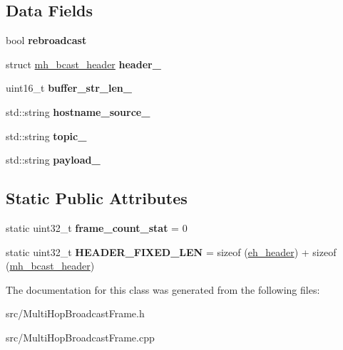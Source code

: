 \subsection*{Data Fields}
\begin{DoxyCompactItemize}
\item 
\hypertarget{classMultiHopBroadcastFrame_af3386512fd14333945a2880d56a49050}{bool {\bfseries rebroadcast}}\label{classMultiHopBroadcastFrame_af3386512fd14333945a2880d56a49050}

\item 
\hypertarget{classMultiHopBroadcastFrame_aa0908ec720cf4b166d8241bbeda3ef72}{struct \hyperlink{structmh__bcast__header}{mh\-\_\-bcast\-\_\-header} {\bfseries header\-\_\-}}\label{classMultiHopBroadcastFrame_aa0908ec720cf4b166d8241bbeda3ef72}

\item 
\hypertarget{classMultiHopBroadcastFrame_a74ca707efb4010d99e5fedc2c0139b7e}{uint16\-\_\-t {\bfseries buffer\-\_\-str\-\_\-len\-\_\-}}\label{classMultiHopBroadcastFrame_a74ca707efb4010d99e5fedc2c0139b7e}

\item 
\hypertarget{classMultiHopBroadcastFrame_ac02d0f6c484c46b61306308a37a24ea2}{std\-::string {\bfseries hostname\-\_\-source\-\_\-}}\label{classMultiHopBroadcastFrame_ac02d0f6c484c46b61306308a37a24ea2}

\item 
\hypertarget{classMultiHopBroadcastFrame_aab544fda0811d4003524c23299390ecf}{std\-::string {\bfseries topic\-\_\-}}\label{classMultiHopBroadcastFrame_aab544fda0811d4003524c23299390ecf}

\item 
\hypertarget{classMultiHopBroadcastFrame_a52f9b2799c52d49cf8ee0cea737de234}{std\-::string {\bfseries payload\-\_\-}}\label{classMultiHopBroadcastFrame_a52f9b2799c52d49cf8ee0cea737de234}

\end{DoxyCompactItemize}
\subsection*{Static Public Attributes}
\begin{DoxyCompactItemize}
\item 
\hypertarget{classMultiHopBroadcastFrame_a4db937c772e736c50aca80727128310a}{static uint32\-\_\-t {\bfseries frame\-\_\-count\-\_\-stat} = 0}\label{classMultiHopBroadcastFrame_a4db937c772e736c50aca80727128310a}

\item 
\hypertarget{classMultiHopBroadcastFrame_a502ee128ede8ca2bcb30c18243daee8f}{static uint32\-\_\-t {\bfseries H\-E\-A\-D\-E\-R\-\_\-\-F\-I\-X\-E\-D\-\_\-\-L\-E\-N} = sizeof (\hyperlink{structeh__header}{eh\-\_\-header}) + sizeof (\hyperlink{structmh__bcast__header}{mh\-\_\-bcast\-\_\-header})}\label{classMultiHopBroadcastFrame_a502ee128ede8ca2bcb30c18243daee8f}

\end{DoxyCompactItemize}


The documentation for this class was generated from the following files\-:\begin{DoxyCompactItemize}
\item 
src/Multi\-Hop\-Broadcast\-Frame.\-h\item 
src/Multi\-Hop\-Broadcast\-Frame.\-cpp\end{DoxyCompactItemize}
